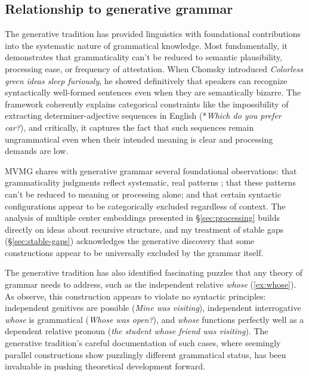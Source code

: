\documentclass[12pt,letterpaper]{article}
\newcommand{\mention}[1]{\textit{#1}}
\begin{document}
\subsection{Relationship to generative grammar}

The generative tradition has provided linguistics with foundational contributions into the systematic nature of grammatical knowledge. Most fundamentally, it demonstrates that grammaticality can't be reduced to semantic plausibility, processing ease, or frequency of attestation. When Chomsky introduced \textit{Colorless green ideas sleep furiously}, he showed definitively that speakers can recognize syntactically well-formed sentences even when they are semantically bizarre. The framework coherently explains categorical constraints like the impossibility of extracting determiner-adjective sequences in English (*\textit{Which do you prefer car?}), and critically, it captures the fact that such sequences remain ungrammatical even when their intended meaning is clear and processing demands are low. 

MVMG shares with generative grammar several foundational observations: that grammaticality judgments reflect systematic, real patterns \autocite{dennett1991}; that these patterns can't be reduced to meaning or processing alone; and that certain syntactic configurations appear to be categorically excluded regardless of context. The analysis of multiple center embeddings presented in \S\ref{sec:processing} builds directly on ideas about recursive structure, and my treatment of stable gaps (\S\ref{sec:stable-gaps}) acknowledges the generative discovery that some constructions appear to be universally excluded by the grammar itself.

The generative tradition has also identified fascinating puzzles that any theory of grammar needs to address, such as the independent relative \mention{whose} (\ref{ex:whose}). As \textcite{hankamer1973whose} observe, this construction appears to violate no syntactic principles: independent genitives are possible (\textit{Mine was visiting}), independent interrogative \mention{whose} is grammatical (\textit{Whose was open?}), and \mention{whose} functions perfectly well as a dependent relative pronoun (\textit{the student whose friend was visiting}). The generative tradition's careful documentation of such cases, where seemingly parallel constructions show puzzlingly different grammatical status, has been invaluable in pushing theoretical development forward.
\end{document}
